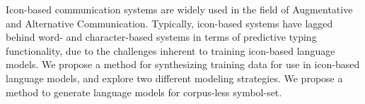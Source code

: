 Icon-based communication systems are widely used in the field of Augmentative and Alternative Communication. Typically, icon-based systems have lagged behind word- and character-based systems in terms of predictive typing functionality, due to the challenges inherent to training icon-based language models. We propose a method for synthesizing training data for use in icon-based language models, and explore two different modeling strategies. We propose a method to generate language models for corpus-less symbol-set.
